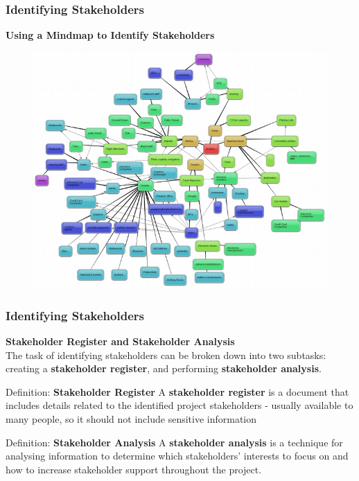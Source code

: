 \documentclass{beamer}
\begin{document}
\begin{frame}
\frametitle{Identifying Stakeholders}
\textbf{Using a Mindmap to Identify Stakeholders}
\begin{figure}
\includegraphics[scale=0.45]{mind_map_stakeholder}
\end{figure}
\end{frame}

\begin{frame}
\frametitle{Identifying Stakeholders}
\textbf{Stakeholder Register and Stakeholder Analysis}\\
\vspace{0.5cm}
The task of identifying stakeholders can be broken down into two subtasks: creating a \textbf{stakeholder register}, and performing \textbf{stakeholder analysis}.
\vspace{0.5cm}
\begin{block}{Definition: \textbf{Stakeholder Register}}
A \textbf{stakeholder register} is a document that includes details related to the identified project stakeholders - usually available to many people, so it should not include sensitive information
\end{block}
\vspace{0.2cm}
\begin{block}{Definition: \textbf{Stakeholder Analysis}}
A \textbf{stakeholder analysis} is a technique for analysing information to determine which stakeholders' interests to focus on and how to increase stakeholder support throughout the project.
\end{block}
\end{frame}
\end{document}
